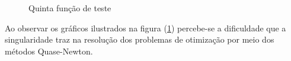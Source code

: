 \begin{figure}[h!]
    \centering 
    \qquad
    \qquad
    \caption{Quinta função de teste}%
    \label{fig:sexfun}%
\end{figure}
\FloatBarrier

Ao observar os gráficos ilustrados na figura (\ref{fig:sexfun}) percebe-se a dificuldade que a singularidade traz na resolução dos problemas de otimização por meio dos métodos Quase-Newton.

